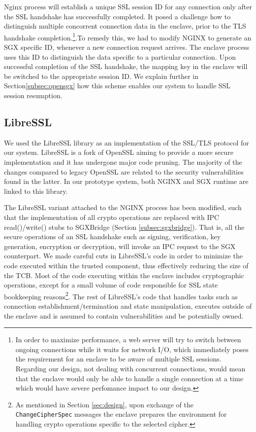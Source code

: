 \documentclass[../main.tex]{subfiles}
\begin{document}
Nginx process will establish a unique SSL session ID for any 
connection only after the SSL handshake has successfully completed. It posed a 
challenge how to distinguish multiple concorrent connection data in the enclave,
prior to the TLS handshake completion.\footnote{In order to maximize
performance, a web server will try to switch between ongoing connections while
it waits for network I/O, which immediately poses the requirement for an
enclave to be aware of multiple SSL sessions. Regarding our design, not dealing
with concurrent connections, would mean that the enclave would only be able to
handle a single connection at a time which would have severe perfomance impact
to our design.}.To remedy this, we had to modify NGINX to generate an SGX specific ID, 
whenever a new connection request arrives. The enclave process uses this ID to distinguish
the data specific to a particular connection. Upon successful completion of the SSL handshake, the 
mapping key in the enclave will be switched to the appropriate session ID. We explain 
further in Section\ref{subsec:opensgx} how this scheme enables our system to handle 
SSL session resumption.

\subsection{LibreSSL}
\label{subsec:libressl}
We used the LibreSSL library as an implementation of the SSL/TLS protocol for
our system. LibreSSL is a fork of OpenSSL aiming to provide a more secure
implementation and it has undergone major code pruning. The majority of the
changes compared to legacy OpenSSL are related to the security vulnerabilities
found in the latter. In our prototype system, both NGINX and SGX runtime are
linked to this library.

The LibreSSL variant attached to the NGINX process has been modified, such that
 the implementation of all crypto operations are replaced with IPC
read()/write() stubs to SGXBridge (Section \ref{subsec:sgxbridge}). That is,
all the secure operations of an SSL handshake such as signing, verification,
key generation, encryption or decryption, will invoke an IPC request to the SGX
counterpart. We made careful cuts in LibreSSL's code in order to minimize the
code executed within the trusted component, thus effectively reducing the size
of the TCB. Most of the code executing within the enclave includes
cryptographic operations, except for a small volume of code responsible for
SSL state bookkeeping reasons\footnote{As mentioned in Section
\ref{sec:design}, upon exchange of the \texttt{ChangeCipherSpec} messages the
enclave prepares the environment for handling crypto operations specific to
the selected cipher.}. The rest of LibreSSL's code that handles tasks such as
connection establishment/termination and state manipulation, executes outside
of the enclave and is assumed to contain vulnerabilities and be potentially
owned.
\end{document}
